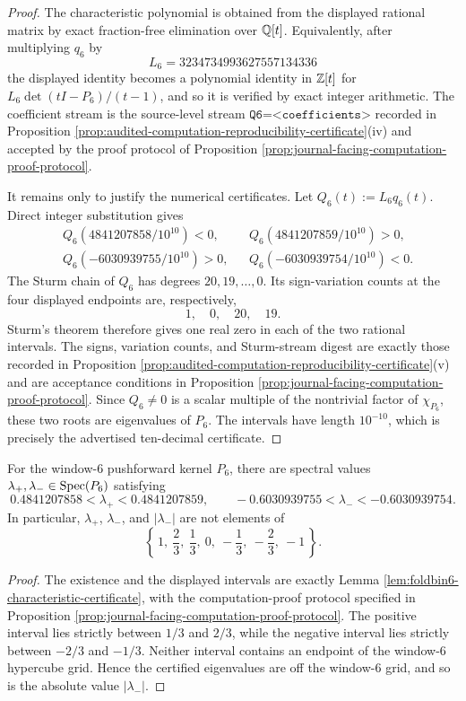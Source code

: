 \begin{proof}
The characteristic polynomial is obtained from the displayed rational matrix by exact fraction-free elimination over \(\mathbb{Q}[t]\).  Equivalently, after multiplying \(q_6\) by
\[
L_6=3234734993627557134336
\]
the displayed identity becomes a polynomial identity in \(\mathbb{Z}[t]\) for \(L_6\det(tI-P_6)/(t-1)\), and so it is verified by exact integer arithmetic.  The coefficient stream is the source-level stream \(\texttt{Q6=<coefficients>}\) recorded in Proposition \ref{prop:audited-computation-reproducibility-certificate}\textup{(iv)} and accepted by the proof protocol of Proposition \ref{prop:journal-facing-computation-proof-protocol}.

It remains only to justify the numerical certificates.  Let \(Q_6(t):=L_6q_6(t)\).  Direct integer substitution gives
\[
\begin{aligned}
&Q_6(4841207858/10^{10})<0,
&&Q_6(4841207859/10^{10})>0,\\
&Q_6(-6030939755/10^{10})>0,
&&Q_6(-6030939754/10^{10})<0.
\end{aligned}
\]
The Sturm chain of \(Q_6\) has degrees \(20,19,\ldots,0\).  Its sign-variation counts at the four displayed endpoints are, respectively,
\[
1,
\quad 0,
\quad 20,
\quad 19.
\]
Sturm's theorem therefore gives one real zero in each of the two rational intervals.  The signs, variation counts, and Sturm-stream digest are exactly those recorded in Proposition \ref{prop:audited-computation-reproducibility-certificate}\textup{(v)} and are acceptance conditions in Proposition \ref{prop:journal-facing-computation-proof-protocol}.  Since \(Q_6\ne0\) is a scalar multiple of the nontrivial factor of \(\chi_{P_6}\), these two roots are eigenvalues of \(P_6\).  The intervals have length \(10^{-10}\), which is precisely the advertised ten-decimal certificate. \qedhere
\end{proof}

\begin{lemma}\label{lem:foldbin6-eigenvalue-interval-certificate}
For the window-\(6\) pushforward kernel \(P_6\), there are spectral values \(\lambda_+,\lambda_-\in\operatorname{Spec}(P_6)\) satisfying
\[
0.4841207858<\lambda_+<0.4841207859,
\qquad
-0.6030939755<\lambda_-<-0.6030939754.
\]
In particular, \(\lambda_+\), \(\lambda_-\), and \(|\lambda_-|\) are not elements of
\[
\left\{\,1,\ \frac23,\ \frac13,\ 0,\ -\frac13,\ -\frac23,\ -1\,\right\}.
\]
\end{lemma}
\begin{proof}
The existence and the displayed intervals are exactly Lemma \ref{lem:foldbin6-characteristic-certificate}, with the computation-proof protocol specified in Proposition \ref{prop:journal-facing-computation-proof-protocol}.  The positive interval lies strictly between \(1/3\) and \(2/3\), while the negative interval lies strictly between \(-2/3\) and \(-1/3\).  Neither interval contains an endpoint of the window-\(6\) hypercube grid.  Hence the certified eigenvalues are off the window-\(6\) grid, and so is the absolute value \(|\lambda_-|\). \qedhere
\end{proof}

